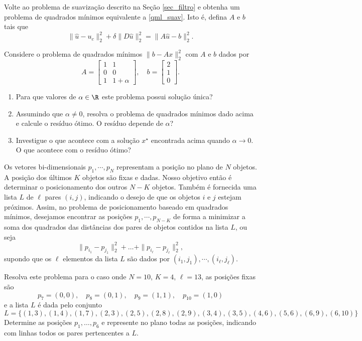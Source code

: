 \begin{problem}
Volte ao problema de suavização descrito na Seção \ref{sec_filtro} e obtenha um problema de quadrados mínimos equivalente a \eqref{qml_suav}. Isto é, defina $A$ e $b$ tais que
\[
\|\hat u - u_c \|_2^2 + \delta \|D\hat u\|_2^2 = \|A \hat u - b\|_2^2.
\]
\end{problem}

\begin{problem}
Considere o problema de quadrados mínimos $\|b - Ax\|_2^2$ com $A$ e $b$ dados por
\[
A = \begin{bmatrix}
1 & 1 \\ 0 & 0 \\ 1 & 1 + \alpha
\end{bmatrix}, \quad b = \begin{bmatrix}
2 \\ 1 \\ 0
\end{bmatrix}.
\]
\begin{enumerate}[label=(\alph*)]
\item Para que valores de $\alpha \in \R$ este problema possui solução única?
\item Assumindo que $\alpha \neq 0$, resolva o problema de quadrados mínimos dado acima e calcule o resíduo ótimo. O resíduo depende de $\alpha$?
\item Investigue o que acontece com a solução $x^\star$ encontrada acima quando $\alpha \to 0$. O que acontece com o resíduo ótimo?
\end{enumerate}
\end{problem}

\begin{problem} Os vetores bi-dimensionais $p_1,\cdots,p_N$ representam a posição no plano de $N$ objetos. A posição dos últimos $K$ objetos são fixas e dadas. Nosso objetivo então é determinar o posicionamento dos outros $N-K$ objetos. Também é fornecida uma lista $L$ de $\ell$ pares $(i,j)$, indicando o desejo de que os objetos $i$ e $j$ estejam próximos. Assim, no problema de posicionamento baseado em quadrados mínimos, desejamos encontrar as posições $p_1,\cdots,p_{N-K}$ de forma a minimizar a soma dos quadrados das distâncias dos pares de objetos contidos na lista $L$, ou seja
         \[
           \|p_{i_1} - p_{j_1}\|_2^2 + \ldots + \|p_{i_\ell} - p_{j_\ell}\|_2^2,
         \]
supondo que os $\ell$ elementos da lista $L$ são dados por $(i_1,j_1),\cdots,(i_\ell,j_\ell)$.
        
         Resolva este problema para o caso onde $N = 10$, $K = 4$, $\ell = 13$, as posições fixas são
\[
p_7 = (0,0), \quad p_8 = (0,1), \quad p_9 = (1,1), \quad p_{10} = (1,0)
\]
         e a lista $L$ é dada pelo conjunto
         \begin{equation*}
           L = \{(1,3), (1,4), (1,7), (2,3), (2,5), (2,8), (2,9), (3,4), (3,5), (4,6), (5,6), (6,9), (6,10)\}
         \end{equation*}
Determine as posições $p_1,\ldots,p_6$ e represente no plano todas as posições, indicando com linhas todos os pares pertencentes a $L$. 
\end{problem}

